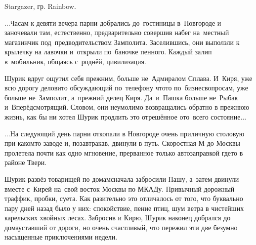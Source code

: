 {\raggedleft \scriptsize \mdash Stargazer, гр. Rainbow. \par}


\newpage
$\ldots$Часам к девяти вечера парни добрались до~гостиницы в~Новгороде и заночевали там, естественно, предварительно совершив набег на~местный магазинчик под~предводительством Замполита. Заселившись, они выползли к крылечку на лавочки и~открыли по~баночке пенного. Каждый залип в~мобильник, общаясь с~роднёй, цивилизация. 

Шурик вдруг ощутил себя прежним, больше не~Адмиралом Сплава. И~Киря, уже всю дорогу деловито обсуждающий по~телефону что\sdash то по~бизнес\sdash вопросам, уже больше не~Замполит, а~прежний делец Киря. Да~и~Пашка больше не~Рыбак и~Вперёдсмотрящий. Словом, они неумолимо возвращались обратно в прежнюю жизнь, как бы ни хотел Шурик продлить это отрешённое ото~всего состояние$\ldots$

$\ldots$На следующий день парни откопали в Новгороде очень приличную столовую при каком\sdash то заводе и, позавтракав, двинули в путь. Скоростная М до Москвы пролетела почти как одно мгновение, прерванное только автозаправкой где\sdash то в районе Твери.

Шурик развёз товарищей по домам\mdash сначала забросили Пашу, а~затем двинули вместе с~Кирей на~свой восток Москвы по МКАДу. Привычный дорожный траффик, пробки, суета. Как разительно это отличалось от того, что буквально пару дней назад было у них: спокойствие, пение птиц, шум ветра в чистейших карельских хвойных лесах. Забросив и Кирю, Шурик наконец добрался до дома\mdash уставший от дороги, но очень счастливый, что пережил эти две безумно насыщенные приключениями недели.





%
%
%
%
%



\begin{center}
\end{center}
